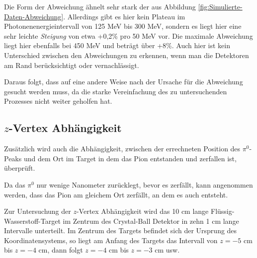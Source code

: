 \documentclass[a4paper,11pt,oneside,final,german,openbib,pdftex]{scrbook}
\begin{document}
{ Die Form der Abweichung ähnelt sehr stark der aus Abbildung \ref{fig:Simulierte-Daten-Abweichung}.
 Allerdings gibt es hier kein Plateau im Photonenenergieintervall von 125 MeV bis 300 MeV, sondern es liegt hier eine sehr leichte \textit{Steigung} von etwa +0,2\% pro 50 MeV vor. Die maximale Abweichung liegt hier ebenfalls bei 450 MeV und betr\"agt über +8\%. Auch hier ist kein Unterschied zwischen den Abweichungen zu erkennen, wenn man die Detektoren am Rand berücksichtigt oder vernachlässigt. 

Daraus folgt, dass auf eine andere Weise nach der Ursache für die Abweichung gesucht werden muss, da die starke Vereinfachung des zu untersuchenden Prozesses nicht weiter geholfen hat.


\subsection{$z$-Vertex Abh\"angigkeit}
\label{sec:Z-Vertex-Abhaengigkeit}


Zusätzlich wird auch die Abh\"angigkeit, zwischen der errechneten  Position des $\pi^0$-Peaks und dem Ort im Target in dem das Pion entstanden und zerfallen ist, \"uberpr\"uft. 

Da das $\pi^0$ nur wenige Nanometer zur\"ucklegt, bevor es zerf\"allt, kann angenommen werden, dass das Pion am gleichem Ort zerf\"allt, an dem es auch entsteht.


Zur Untersuchung der $z$-Vertex Abhängigkeit wird das 10 cm lange Fl\"ussig-Wasserstoff-Target im Zentrum des Crystal-Ball Detektor in zehn 1 cm lange Intervalle unterteilt. 
Im Zentrum des Targets befindet sich der Ursprung des Koordinatensystems, so liegt am Anfang des Targets das Intervall von $z=-5$ cm bis $z=-4$ cm, dann folgt $z=-4$ cm bis $z=-3$ cm usw. 

}
\end{document}
